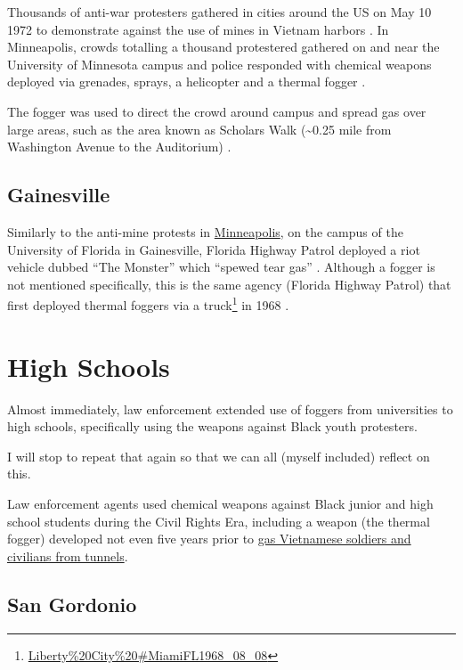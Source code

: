 \documentclass[
  12pt,
]{krantz}
\renewcommand{\href}[2]{#2\footnote{\url{#1}}}
\begin{document}
Thousands of anti-war protesters gathered in cities around the US on May 10 1972 to demonstrate against the use of mines in Vietnam harbors \citep{ArgusLeader1972_05_11a}.
In Minneapolis, crowds totalling a thousand protestered gathered on and near the University of Minnesota campus and police responded with chemical weapons deployed via grenades, sprays, a helicopter and a thermal fogger \citep{ArgusLeader1972_05_11b, StarTribune1972_05_11}.

The fogger was used to direct the crowd around campus and spread gas over large areas, such as the area known as Scholars Walk (\textasciitilde0.25 mile from Washington Avenue to the Auditorium) \citep{StarTribune1972_05_11}.

\hypertarget{gainesville}{%
\section*{Gainesville}\label{gainesville}}


Similarly to the anti-mine protests in \protect\hyperlink{Minneapolis1972_05_10}{Minneapolis}, on the campus of the University of Florida in Gainesville, Florida Highway Patrol deployed a riot vehicle dubbed ``The Monster'' which ``spewed tear gas'' \citep{ArgusLeader1972_05_11b}.
Although a fogger is not mentioned specifically, this is the same agency (Florida Highway Patrol) that first \href{Liberty\%20City\%20\#MiamiFL1968_08_08}{deployed thermal foggers via a truck} in 1968 \citep{Tschenschlok1995, Lorentzen2018}.

\hypertarget{high-schools}{%
\chapter*{High Schools}\label{high-schools}}


Almost immediately, law enforcement extended use of foggers from \protect\hypertarget{Universities}{}{universities} to high schools, specifically using the weapons against Black youth protesters.

I will stop to repeat that again so that we can all (myself included) reflect on this.

Law enforcement agents used chemical weapons against Black junior and high school students during the Civil Rights Era, including a weapon (the thermal fogger) developed not even five years prior to \protect\hyperlink{Vietnam}{gas Vietnamese soldiers and civilians from tunnels}.

\hypertarget{SanGordonio}{%
\section*{San Gordonio}\label{SanGordonio}}
\end{document}
